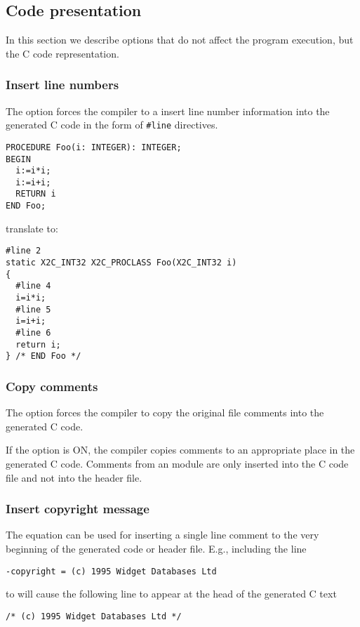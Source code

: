 \subsection{Code presentation}\label{maptoc:opt:rep}

In  this  section  we  describe options that do not affect the
program execution, but the C code representation.

\subsubsection{Insert line numbers}

The  option forces the
compiler  to a insert line number information into the generated C
code in the form of \verb+#line+ directives.
\Example
\begin{verbatim}
PROCEDURE Foo(i: INTEGER): INTEGER;
BEGIN
  i:=i*i;
  i:=i+i;
  RETURN i
END Foo;
\end{verbatim}
translate to:
\begin{verbatim}
#line 2
static X2C_INT32 X2C_PROCLASS Foo(X2C_INT32 i)
{
  #line 4
  i=i*i;
  #line 5
  i=i+i;
  #line 6
  return i;
} /* END Foo */
\end{verbatim}

\subsubsection{Copy comments}

The  option forces the
compiler  to copy the original file comments into the generated C
code.

If the option is ON, the compiler copies comments to an appropriate
place in the  generated  C  code.  Comments from an \ot{} module are
only inserted into the C code file and not into the header file.


\subsubsection{Insert copyright message}

The  equation can be
used  for inserting a single line comment to the very beginning of
the generated code or header file. E.g., including the line
\begin{verbatim}
-copyright = (c) 1995 Widget Databases Ltd
\end{verbatim}
to {\bf \cfg} will cause the following line to appear
at the head of the generated C text
\begin{verbatim}
/* (c) 1995 Widget Databases Ltd */
\end{verbatim}

